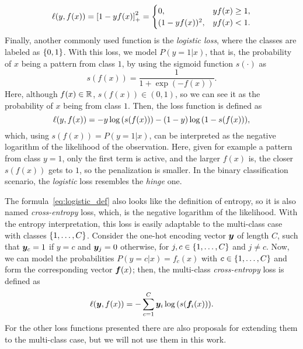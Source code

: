 \begin{equation}
    \label{eq:sqhinge_def}
    \lossf(y, f(x)) = \pospart{1 - yf(x)}^2 = 
    \begin{cases}
        0, & y f(x) \geq 1 ,\\
        (1 - y f(x))^2, & y f(x) < 1 .
    \end{cases}
\end{equation}
%
Finally, another commonly used function is the \emph{logistic loss}, where the classes are labeled as $\left\{0, 1\right\}$. With this loss, we model $P(y=1 \vert x)$, that is, the probability of $x$ being a pattern from class $1$, by using the sigmoid function $s(\cdot)$ as 
$$ s(f(x)) = \frac{1}{1 + \exp{(-f(x))}} .$$
Here, although $f(x) \in \mathbb{R}$, $s(f(x)) \in (0, 1)$, so we can see it as the probability of $x$ being from class $1$. Then, the loss function is defined as 
\begin{equation}
    \label{eq:logistic_def}
    \lossf(y, f(x)) = - y \log{(s(f(x)))} - (1 - y) \log{(1 - s(f(x)))} ,
\end{equation} 
which, using $s(f(x)) = P(y=1 \vert x)$, can be interpreted as the negative logarithm of the likelihood of the observation.
%
Here, given for example a pattern from class $y=1$, only the first term is active, and the larger $f(x)$ is, the closer $s(f(x))$ gets to $1$, so the penalization is smaller.
In the binary classification scenario, the \emph{logistic} loss resembles the \emph{hinge} one. 

The formula~\eqref{eq:logistic_def} also looks like the definition of entropy, so it is also named \emph{cross-entropy} loss, which, is the negative logarithm of the likelihood. 
With the entropy interpretation, this loss is easily adaptable to the multi-class case with classes $\left\{1, \ldots, C\right\}$. Consider the one-hot encoding vector $\bm{y}$ of length $C$, such that $\bm{y}_c = 1$ if $y=c$ and $\bm{y}_j = 0$ otherwise, for $j, c \in \left\{1, \ldots, C\right\}$ and $j \neq c$.
Now, we can model the probabilities $P(y=c \vert x) = f_c(x)$ with $c \in \left\{1, \ldots, C\right\}$ and form the corresponding vector $\bm{f}(x)$; then, the multi-class \emph{cross-entropy} loss is defined as 
\begin{equation}
    \label{eq:crossentropy_def}
    \lossf(\fv{y}, f(x)) = - \sum_{c=1}^C \fv{y}_i \log{(s(\fv{f}_i(x)))} .
\end{equation} 
For the other loss functions presented there are also proposals for extending them to the multi-class case, but we will not use them in this work.

